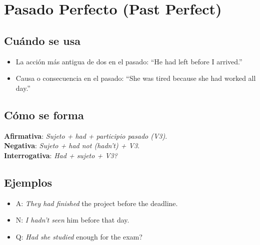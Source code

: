 \documentclass[11pt,a4paper]{article}
\begin{document}
\section{Pasado Perfecto (Past Perfect)}
\subsection*{Cuándo se usa}
\begin{itemize}
  \item La acción más antigua de dos en el pasado: ``He had left before I arrived.''
  \item Causa o consecuencia en el pasado: ``She was tired because she had worked all day.''
\end{itemize}

\subsection*{Cómo se forma}
\textbf{Afirmativa}: \emph{Sujeto + had + participio pasado (V3)}.\\
\textbf{Negativa}: \emph{Sujeto + had not (hadn’t) + V3}.\\
\textbf{Interrogativa}: \emph{Had + sujeto + V3?}

\subsection*{Ejemplos}
\begin{itemize}
  \item A: \emph{They had finished} the project before the deadline.
  \item N: \emph{I hadn’t seen} him before that day.
  \item Q: \emph{Had she studied} enough for the exam?
\end{itemize}
\end{document}
